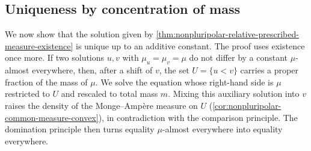 \subsection{Uniqueness by concentration of mass}
\label{sec:relative-prescribed-measure-uniqueness}
We now show that the solution given by \cref{thm:nonpluripolar-relative-prescribed-measure-existence} is unique up to an additive constant. The proof uses existence once more. If two solutions $u,v$ with $\mu_u=\mu_v=\mu$ do not differ by a constant $\mu$-almost everywhere, then, after a shift of $v$, the set $U=\{u<v\}$ carries a proper fraction of the mass of $\mu$. We solve the equation whose right-hand side is $\mu$ restricted to $U$ and rescaled to total mass $m$. Mixing this auxiliary solution into $v$ raises the density of the Monge--Amp\`ere measure on $U$ (\cref{cor:nonpluripolar-common-measure-convex}), in contradiction with the comparison principle. The domination principle then turns equality $\mu$-almost everywhere into equality everywhere.

